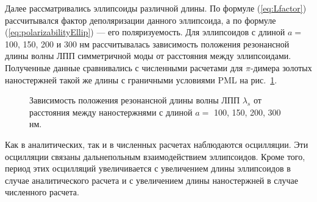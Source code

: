 Далее рассматривались эллипсоиды различной длины. По формуле (\ref{eq:Lfactor}) рассчитывался фактор деполяризации данного эллипсоида, а по формуле (\ref{eq:polarizabilityEllip}) --- его поляризуемость. Для эллипсоидов с длиной $ a = $ 100, 150, 200 и 300 нм рассчитывалась зависимость положения резонансной длины волны ЛПП симметричной моды от расстояния между эллипсоидами. Полученные данные сравнивались с численными расчетами для $ \pi $-димера золотых наностержней такой же длины с граничными условиями PML на рис.~\ref{img:res1_analytic_FDTD}.
\begin{figure}[t]
\caption{Зависимость положения резонансной длины волны ЛПП $ \lambda_s $ от расстояния между наностержнями с длиной $ a = $ 100, 150, 200, 300 нм.}
\label{img:res1_analytic_FDTD}
\end{figure}
Как в аналитических, так и в численных расчетах наблюдаются осцилляции. Эти осцилляции связаны дальнепольным взаимодействием эллипсоидов. Кроме того, период этих осцилляций увеличивается с увеличением длины эллипсоидов в случае аналитического расчета и с увеличением длины наностержней в случае численного расчета. 
